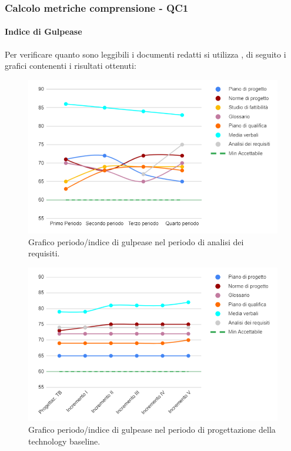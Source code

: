 \subsubsection{Calcolo metriche comprensione - QC1}

\paragraph{Indice di Gulpease}
Per verificare quanto sono leggibili i documenti redatti si utilizza , di seguito i grafici contenenti i risultati ottenuti:

\begin{figure}[H]
	\centering
	\includegraphics[width=0.8\linewidth]{./res/images/gulpease_1.png}
	\caption{Grafico periodo/indice di gulpease nel periodo di analisi dei requisiti.}
	\label{fig:Grafico indice di gulpease periodo di analisi dei requisiti.}
\end{figure}

\begin{figure}[H]
	\centering
	\includegraphics[width=0.8\linewidth]{./res/images/gulpease_2.png}
	\caption{Grafico periodo/indice di gulpease nel periodo di progettazione della technology baseline.}
	\label{fig:Grafico indice di gulpease periodo di progettazione della technology baseline.}
\end{figure}

